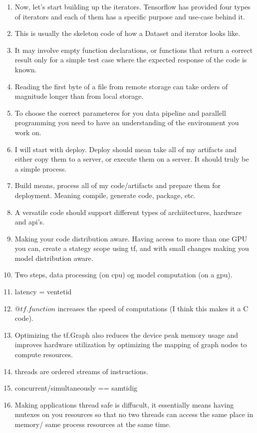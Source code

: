 \begin{enumerate}
    \item Now, let’s start building up the iterators. Tensorflow has provided four types of iterators and each of them has a specific purpose and use-case behind it.
    \item This is usually the skeleton code of how a Dataset and iterator looks like.
    \item It may involve empty function declarations, or functions that return a correct result only for a simple test case where the expected response of the code is known.
    \item Reading the first byte of a file from remote storage can take orders of magnitude longer than from local storage.
    
    \item To choose the correct parameteres for you data pipeline and parallell programming you need to have an understanding of the environment you work on.
    \item I will start with deploy. Deploy should mean take all of my artifacts and either copy them to a server, or execute them on a server. It should truly be a simple process.
    \item Build means, process all of my code/artifacts and prepare them for deployment. Meaning compile, generate code, package, etc.
    \item A versatile code should support different types of archiitectures, hardware and api's.
    \item Making your code distribution aware. Having access to more than one GPU you can, create a stategy scope using tf, and with small changes making you model distribution aware.
    \item Two steps, data processing (on cpu) og model computation (on a gpu).
    \item latency = ventetid
    \item $@tf.function$ increases the speed of computations (I think this makes it a C code).
    \item Optimizing the tf.Graph also reduces the device peak memory usage and improves hardware utilization by optimizing the mapping of graph nodes to compute resources. 
    \item threads are ordered streams of instructions.
    \item concurrent/simultaneously == samtidig
    \item Making applications thread safe is diffucult, it essentially means having mutexes on you resources so that no two threads can access the same place in memory/ same process resources at the same time.
\end{enumerate}